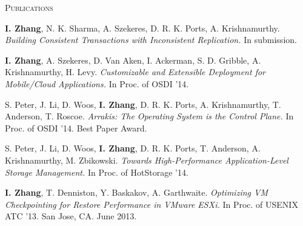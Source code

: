 \documentclass[10pt,times]{report}
\newlength{\sectiongap}
\newlength{\entrygap}
\newlength{\sectioncolwidth}
\newlength{\colgap}
\newlength{\stuffwidth}
\def\ifEqString#1#2{\def\testa{#1}\def\testb{#2}%
  \ifx\testa\testb}
\newenvironment{rtable}{
  \begin{minipage}{\textwidth}
  }{
  \end{minipage}
}
\newenvironment{rentry}[3][xxx]{
  \begin{minipage}[t]{\hsize}
    \textbf{#2}\ifEqString{#1}{xxx}\relax\else, \textit{#1}\fi
    \hspace{\stretch{1}} #3 \\
  }{
    \removelastskip
  \end{minipage}
  \\[\entrygap]  %
}
\newenvironment{rsection}[1]{
  \begin{minipage}[t]{\sectioncolwidth}
    \textsc{#1}
  \end{minipage}
  \hspace{\colgap}
  \begin{minipage}[t]{\stuffwidth}
  }{
    \removelastskip
  \end{minipage}
  \\[\sectiongap]
}
\begin{document}
\begin{rtable}
\vspace{1.0em}
 \begin{rsection}{Publications}
   \textbf{I. Zhang}, N. K. Sharma, A. Szekeres, D. R. K. Ports,
   A. Krishnamurthy. \textit{Building Consistent Transactions with
     Inconsistent Replication.}
   In submission.\\\vspace{-0.5em}

   \textbf{I. Zhang}, A. Szekeres, D. Van Aken, I. Ackerman, S. D. Gribble,
   A. Krishnamurthy, H. Levy. \textit{Customizable and Extensible
     Deployment for Mobile/Cloud Applications.} In Proc. of OSDI '14.\\\vspace{-0.5em}

   S. Peter, J. Li, D. Woos, \textbf{I. Zhang}, D. R. K. Ports, A. Krishnamurthy,
   T. Anderson, T. Roscoe. \textit{Arrakis: The Operating System is
     the Control Plane.} In Proc. of OSDI '14. Best Paper Award.\\\vspace{-0.5em}

   S. Peter, J. Li, D. Woos, \textbf{I. Zhang}, D. R. K. Ports, T. Anderson,
   A. Krishnamurthy, M. Zbikowski. \textit{Towards High-Performance
     Application-Level Storage Management.} In Proc. of HotStorage
   '14. \\\vspace{-0.5em}

    \textbf{I. Zhang}, T. Denniston, Y. Baskakov, A. Garthwaite. \textit{Optimizing
      VM Checkpointing for Restore Performance in VMware ESXi.} In
    Proc. of USENIX ATC '13. San Jose, CA. June 2013.\\\vspace{-0.5em}


\end{rsection}
\end{rtable}
\end{document}

